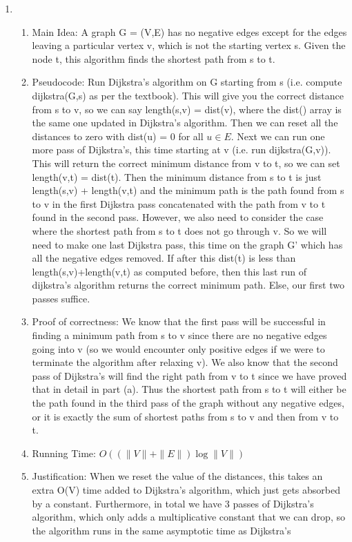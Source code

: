 \documentclass[11pt]{article}
\newenvironment{qparts}{\begin{enumerate}[{(}a{)}]}{\end{enumerate}}
\begin{document}
\begin{qparts}
\item
\begin{enumerate}
\item Main Idea: A graph G = (V,E) has no negative edges except for the edges leaving a particular vertex v, which is not the starting vertex s. Given the node t, this algorithm finds the shortest path from s to t.
\item Pseudocode: Run Dijkstra's algorithm on G starting from s (i.e. compute dijkstra(G,s) as per the textbook). This will give you the correct distance from s to v, so we can say length(s,v) = dist(v), where the dist() array is the same one updated in Dijkstra's algorithm. Then we can reset all the distances to zero with dist(u) = 0 for all $u \in E$. Next we can run one more pass of Dijkstra's, this time starting at v (i.e. run dijkstra(G,v)). This will return the correct minimum distance from v to t, so we can set length(v,t) = dist(t). Then the minimum distance from s to t is just length(s,v) + length(v,t) and the minimum path is the path found from s to v in the first Dijkstra pass concatenated with the path from v to t found in the second pass. However, we also need to consider the case where the shortest path from s to t does not go through v. So we will need to make one last Dijkstra pass, this time on the graph G' which has all the negative edges removed. If after this dist(t) is less than length(s,v)+length(v,t) as computed before, then this last run of dijkstra's algorithm returns the correct minimum path. Else, our first two passes suffice.
\item Proof of correctness: We know that the first pass will be successful in finding a minimum path from s to v since there are no negative edges going into v (so we would encounter only positive edges if we were to terminate the algorithm after relaxing v). We also know that the second pass of Dijkstra's will find the right path from v to t since we have proved that in detail in part (a). Thus the shortest path from s to t will either be the path found in the third pass of the graph without any negative edges, or it is exactly the sum of shortest paths from s to v and then from v to t.
\item Running Time: $O((\|V\|+\|E\|)\log \|V\|)$
\item Justification: When we reset the value of the distances, this takes an extra O(V) time added to Dijkstra's algorithm, which just gets absorbed by a constant. Furthermore, in total we have 3 passes of Dijkstra's algorithm, which only adds a multiplicative constant that we can drop, so the algorithm runs in the same asymptotic time as Dijkstra's
\end{enumerate}
\end{qparts}
\end{document}
